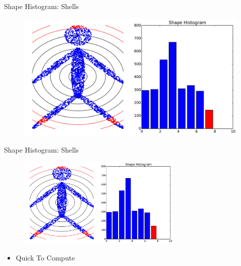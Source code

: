 \documentclass{beamer}
\begin{document}
\begin{frame}{Shape Histogram: Shells}

\begin{figure}[t]
	\centering
    \includegraphics[width=\textwidth]{ShapeHist8.pdf}
\end{figure}

\end{frame}

\begin{frame}{Shape Histogram: Shells}

\begin{figure}[t]
	\centering
    \includegraphics[width=0.7\textwidth]{ShapeHist8.pdf}
\end{figure}

\begin{itemize}[label=$\vartriangleright$]
\item \textcolor<2->{MidGreen}{Quick To Compute}
\end{itemize}

\end{frame}
\end{document}

